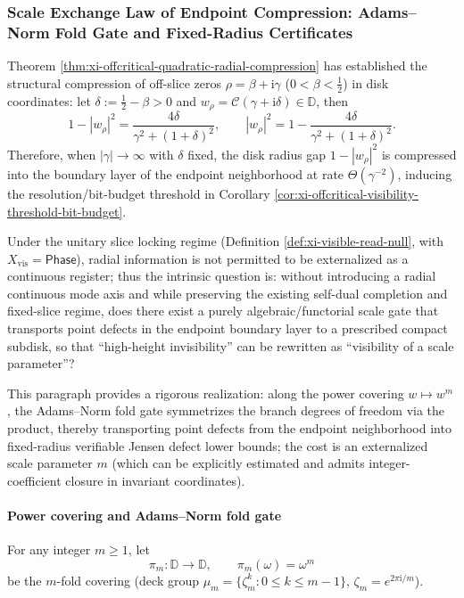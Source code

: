 \subsubsection{Scale Exchange Law of Endpoint Compression: Adams--Norm Fold Gate and Fixed-Radius Certificates}\label{subsubsec:xi-adams-norm-scale-transport}
Theorem \ref{thm:xi-offcritical-quadratic-radial-compression} has established the structural compression of off-slice zeros
\(\rho=\beta+\mathrm{i}\gamma\) (\(0<\beta<\tfrac12\)) in disk coordinates:
let \(\delta:=\tfrac12-\beta>0\) and \(w_\rho=\mathcal{C}(\gamma+\mathrm{i}\delta)\in\mathbb{D}\), then
\[
1-|w_\rho|^2=\frac{4\delta}{\gamma^2+(1+\delta)^2},
\qquad
|w_\rho|^2=1-\frac{4\delta}{\gamma^2+(1+\delta)^2}.
\]
Therefore, when \(|\gamma|\to\infty\) with \(\delta\) fixed, the disk radius gap \(1-|w_\rho|^2\) is compressed into the boundary layer of the endpoint neighborhood at rate \(\Theta(\gamma^{-2})\), inducing the resolution/bit-budget threshold in Corollary \ref{cor:xi-offcritical-visibility-threshold-bit-budget}.
\par
Under the unitary slice locking regime (Definition \ref{def:xi-visible-read-null}, with \(X_{\mathrm{vis}}=\mathsf{Phase}\)), radial information is not permitted to be externalized as a continuous register; thus the intrinsic question is:
without introducing a radial continuous mode axis and while preserving the existing self-dual completion and fixed-slice regime, does there exist a purely algebraic/functorial scale gate that transports point defects in the endpoint boundary layer to a prescribed compact subdisk, so that ``high-height invisibility'' can be rewritten as ``visibility of a scale parameter''?
\par
This paragraph provides a rigorous realization: along the power covering \(w\mapsto w^m\), the Adams--Norm fold gate symmetrizes the branch degrees of freedom via the product, thereby transporting point defects from the endpoint neighborhood into fixed-radius verifiable Jensen defect lower bounds; the cost is an externalized scale parameter \(m\) (which can be explicitly estimated and admits integer-coefficient closure in invariant coordinates).

\paragraph{Power covering and Adams--Norm fold gate}
For any integer \(m\ge 1\), let
\[
\pi_m:\mathbb{D}\to\mathbb{D},\qquad \pi_m(\omega)=\omega^m
\]
be the \(m\)-fold covering (deck group \(\mu_m=\{\zeta_m^k:0\le k\le m-1\}\), \(\zeta_m=e^{2\pi\mathrm{i}/m}\)).


